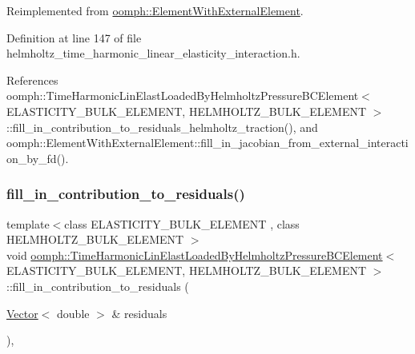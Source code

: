 Reimplemented from \hyperlink{classoomph_1_1ElementWithExternalElement_ae5fb09552a8271e891438f8d058ca1b8}{oomph\+::\+Element\+With\+External\+Element}.



Definition at line 147 of file helmholtz\+\_\+time\+\_\+harmonic\+\_\+linear\+\_\+elasticity\+\_\+interaction.\+h.



References oomph\+::\+Time\+Harmonic\+Lin\+Elast\+Loaded\+By\+Helmholtz\+Pressure\+B\+C\+Element$<$ E\+L\+A\+S\+T\+I\+C\+I\+T\+Y\+\_\+\+B\+U\+L\+K\+\_\+\+E\+L\+E\+M\+E\+N\+T, H\+E\+L\+M\+H\+O\+L\+T\+Z\+\_\+\+B\+U\+L\+K\+\_\+\+E\+L\+E\+M\+E\+N\+T $>$\+::fill\+\_\+in\+\_\+contribution\+\_\+to\+\_\+residuals\+\_\+helmholtz\+\_\+traction(), and oomph\+::\+Element\+With\+External\+Element\+::fill\+\_\+in\+\_\+jacobian\+\_\+from\+\_\+external\+\_\+interaction\+\_\+by\+\_\+fd().

\mbox{\label{classoomph_1_1TimeHarmonicLinElastLoadedByHelmholtzPressureBCElement_a0a69b95db2d95da34929a9750d3bce3d}} 
\subsubsection{\texorpdfstring{fill\+\_\+in\+\_\+contribution\+\_\+to\+\_\+residuals()}{fill\_in\_contribution\_to\_residuals()}}
{\footnotesize\ttfamily template$<$class E\+L\+A\+S\+T\+I\+C\+I\+T\+Y\+\_\+\+B\+U\+L\+K\+\_\+\+E\+L\+E\+M\+E\+NT , class H\+E\+L\+M\+H\+O\+L\+T\+Z\+\_\+\+B\+U\+L\+K\+\_\+\+E\+L\+E\+M\+E\+NT $>$ \\
void \hyperlink{classoomph_1_1TimeHarmonicLinElastLoadedByHelmholtzPressureBCElement}{oomph\+::\+Time\+Harmonic\+Lin\+Elast\+Loaded\+By\+Helmholtz\+Pressure\+B\+C\+Element}$<$ E\+L\+A\+S\+T\+I\+C\+I\+T\+Y\+\_\+\+B\+U\+L\+K\+\_\+\+E\+L\+E\+M\+E\+NT, H\+E\+L\+M\+H\+O\+L\+T\+Z\+\_\+\+B\+U\+L\+K\+\_\+\+E\+L\+E\+M\+E\+NT $>$\+::fill\+\_\+in\+\_\+contribution\+\_\+to\+\_\+residuals (\begin{DoxyParamCaption}\item[{\hyperlink{classoomph_1_1Vector}{Vector}$<$ double $>$ \&}]{residuals }\end{DoxyParamCaption})\hspace{0.3cm}{\ttfamily [inline]}, {\ttfamily [virtual]}}



